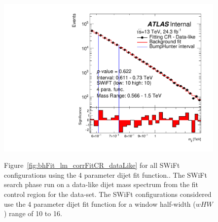 \begin{figure}[!htb]
{  \includegraphics[width=0.48\linewidth, angle=0]{figs/Dibjet/LowMass/FitStudy_min566/bhFit_corrFitCR_dataLike_v13_4para_low10_high10.pdf}
}
\caption[Figure~\ref{fig:bhFit_lm_corrFitCR_dataLike} for all SWiFt configurations using the 4 parameter dijet fit function..]
{\label{fig:app-bhFit_lm_corrFitCR_dataLike_4para}
  Figure~\ref{fig:bhFit_lm_corrFitCR_dataLike} for all SWiFt configurations using the 4 parameter dijet fit function..
  The SWiFt search phase run on a data-like dijet mass spectrum
  from the fit control region for the \lm{} data-set.
  The SWiFt configurations considered use the 4 parameter dijet fit function for a window half-width ($wHW$) range of 10 to 16.
}
\end{figure}
